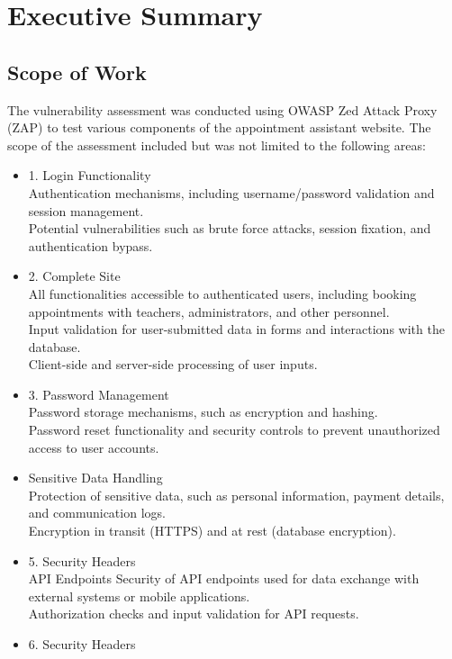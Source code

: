 \documentclass[openany]{report}
\begin{document}
\chapter{Executive Summary}
\section{Scope of Work}
The vulnerability assessment was conducted using OWASP Zed Attack Proxy (ZAP) to test various components of the appointment assistant website. The scope of the assessment included but was not limited to the following areas:
\begin{itemize}
    \item 1. Login Functionality \\
          Authentication mechanisms, including username/password validation and session management.\\
          Potential vulnerabilities such as brute force attacks, session fixation, and authentication bypass.
    \item 2. Complete Site \\
          All functionalities accessible to authenticated users, including booking appointments with teachers, administrators, and other personnel.\\
          Input validation for user-submitted data in forms and interactions with the database.\\
          Client-side and server-side processing of user inputs.
    \item 3. Password Management \\
          Password storage mechanisms, such as encryption and hashing.\\
          Password reset functionality and security controls to prevent unauthorized access to user accounts.
    \item Sensitive Data Handling\\
          Protection of sensitive data, such as personal information, payment details, and communication logs.\\
          Encryption in transit (HTTPS) and at rest (database encryption).
    \item 5. Security Headers\\
          API Endpoints
          Security of API endpoints used for data exchange with external systems or mobile applications.\\
          Authorization checks and input validation for API requests.
    \item 6. Security Headers

\end{itemize}
\end{document}
